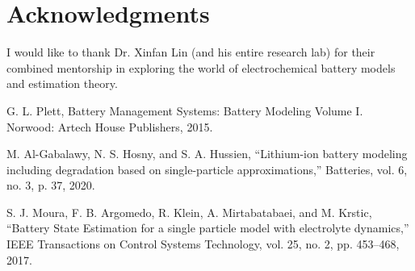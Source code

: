 \documentclass[lettersize,journal]{IEEEtran}
\begin{document}
\section*{Acknowledgments}
\noindent I would like to thank Dr. Xinfan Lin  (and his entire research lab) for their combined mentorship in exploring the world of electrochemical battery models and estimation theory.

\begin{thebibliography}{1}


G. L. Plett, Battery Management Systems: Battery Modeling Volume I. Norwood: Artech House Publishers, 2015.

M. Al-Gabalawy, N. S. Hosny, and S. A. Hussien, “Lithium-ion battery modeling including degradation based on single-particle approximations,” Batteries, vol. 6, no. 3, p. 37, 2020.

S. J. Moura, F. B. Argomedo, R. Klein, A. Mirtabatabaei, and M. Krstic, “Battery State Estimation for a single particle model with electrolyte dynamics,” IEEE Transactions on Control Systems Technology, vol. 25, no. 2, pp. 453–468, 2017.


%
%

\end{thebibliography}


\newpage

\vspace{11pt}


\vspace{11pt}

\vfill
\end{document}

